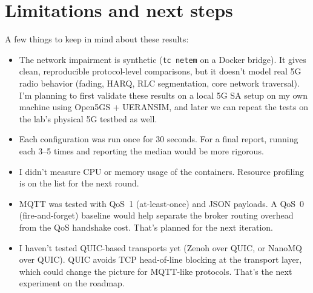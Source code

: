\documentclass[11pt,a4paper]{article}
\begin{document}
\section{Limitations and next steps}

A few things to keep in mind about these results:

\begin{itemize}
    \item The network impairment is synthetic (\texttt{tc netem} on a Docker bridge). It gives clean, reproducible protocol-level comparisons, but it doesn't model real 5G radio behavior (fading, HARQ, RLC segmentation, core network traversal). I'm planning to first validate these results on a local 5G SA setup on my own machine using Open5GS + UERANSIM, and later we can repeat the tests on the lab's physical 5G testbed as well.

    \item Each configuration was run once for 30 seconds. For a final report, running each 3--5 times and reporting the median would be more rigorous.

    \item I didn't measure CPU or memory usage of the containers. Resource profiling is on the list for the next round.

    \item MQTT was tested with QoS~1 (at-least-once) and JSON payloads. A QoS~0 (fire-and-forget) baseline would help separate the broker routing overhead from the QoS handshake cost. That's planned for the next iteration.

    \item I haven't tested QUIC-based transports yet (Zenoh over QUIC, or NanoMQ over QUIC). QUIC avoids TCP head-of-line blocking at the transport layer, which could change the picture for MQTT-like protocols. That's the next experiment on the roadmap.
\end{itemize}
\end{document}

